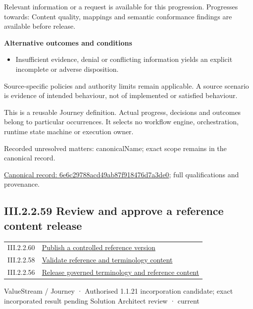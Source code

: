 Relevant information or a request is available for this progression. Progresses towards: Content quality, mappings and semantic conformance findings are available before release.



\par\medskip\textbf{Alternative outcomes and conditions}\par


\begin{itemize}


\item Insufficient evidence, denial or conflicting information yields an explicit incomplete or adverse disposition.

\end{itemize}


Source-specific policies and authority limits remain applicable. A source scenario is evidence of intended behaviour, not of implemented or satisfied behaviour.



This is a reusable Journey definition. Actual progress, decisions and outcomes belong to particular occurrences. It selects no workflow engine, orchestration, runtime state machine or execution owner.


{\small Recorded unresolved matters: canonicalName; exact scope remains in the canonical record.}\par
{\footnotesize \href{../../../../continuum/strategy/value-stream/6e6c29788acd49ab87f918476d7a3de0.md}{Canonical record: 6e6c29788acd49ab87f918476d7a3de0}; full qualifications and provenance.}\par
\subsection*{III.2.2.59 Review and approve a reference content release}
\label{navigation:III.2.2.59}

\begin{longtable}{p{.22\linewidth}p{.73\linewidth}}
III.2.2.60 & \hyperref[element:156eb857d5c14baaae1c1cc59fe3490b]{Publish a controlled reference version} \\
III.2.2.58 & \hyperref[element:6e6c29788acd49ab87f918476d7a3de0]{Validate reference and terminology content} \\
III.2.2.56 & \hyperref[element:e9a8a77c5f9c4361af4dfcfa607ece2d]{Release governed terminology and reference content} \\
\end{longtable}
\label{element:cdca249dbbef4d798219d4732bd8e74f}
{\small ValueStream / Journey · Authorised 1.1.21 incorporation candidate; exact incorporated result pending Solution Architect review · current}\par

